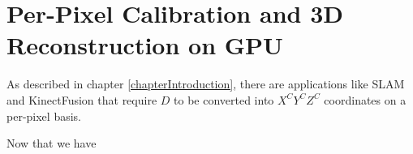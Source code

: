 \chapter{Per-Pixel Calibration and 3D Reconstruction on GPU} %
\label{chapterDataBasedCalibration} 
%
%
%


%
%
%
%
%
As described in chapter \ref{chapterIntroduction}, there are applications like SLAM and KinectFusion that require \(D\) to be converted into \(X^CY^CZ^C\) coordinates on a per-pixel basis.



Now that we have 
%
%
%
